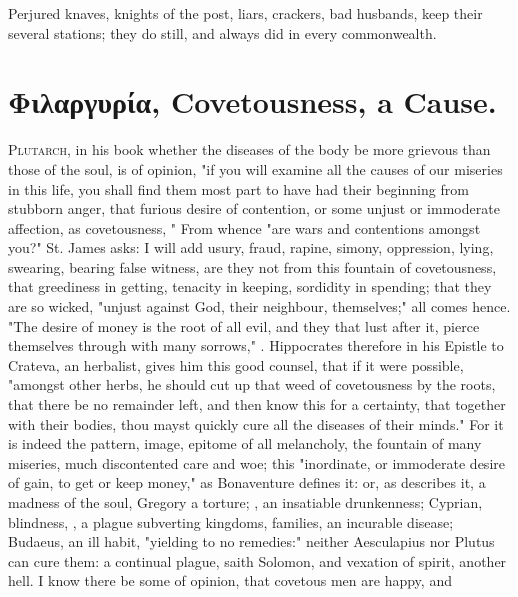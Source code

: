 Perjured knaves, knights of the post, liars, crackers, bad husbands, \etc{} keep their several stations; they do still, and always did in every commonwealth.

\section{\textgreek{Φιλαργυρία}, Covetousness, a Cause.}

\lettrine{P}{lutarch}, in his book whether the diseases of
the body be more grievous than those of the soul, is of opinion, "if you will
examine all the causes of our miseries in this life, you shall find them most
part to have had their beginning from stubborn anger, that furious desire of
contention, or some unjust or immoderate affection, as covetousness, \etc{}"
From whence "are wars and contentions amongst you?" St.
James asks: I will add usury, fraud, rapine, simony, oppression, lying,
swearing, bearing false witness, \etc{} are they not from this fountain of
covetousness, that greediness in getting, tenacity in keeping, sordidity in
spending; that they are so wicked, "unjust against God,
their neighbour, themselves;" all comes hence. "The desire of money is the root
of all evil, and they that lust after it, pierce themselves through with many
sorrows," . Hippocrates therefore in his Epistle to
Crateva, an herbalist, gives him this good counsel, that if it were possible,
"amongst other herbs, he should cut up that weed of
covetousness by the roots, that there be no remainder left, and then know this
for a certainty, that together with their bodies, thou mayst quickly cure all
the diseases of their minds." For it is indeed the pattern, image, epitome of
all melancholy, the fountain of many miseries, much discontented care and woe;
this "inordinate, or immoderate desire of gain, to get or keep money," as
Bonaventure defines it: or, as \Austin{} describes it, a
madness of the soul, Gregory a torture; \Chrysostom{}, an insatiable drunkenness;
Cyprian, blindness, , a plague subverting kingdoms,
families, an incurable disease; Budaeus, an ill habit,
"yielding to no remedies:" neither Aesculapius nor Plutus
can cure them: a continual plague, saith Solomon, and vexation of spirit,
another hell. I know there be some of opinion, that covetous men are happy, and
